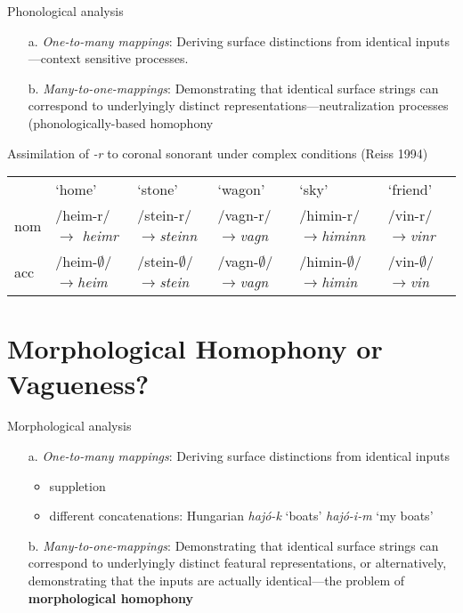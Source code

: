 \documentclass[10pt]{article}
\begin{document}
\begin{example}Phonological analysis
\end{example}

\begin{itemize}
\item[a.]{{\it One-to-many mappings}: Deriving surface distinctions from  identical inputs---context sensitive processes.}
\item[b.]{{\it Many-to-one-mappings}: Demonstrating that identical surface strings can correspond to   underlyingly distinct representations---neutralization processes (phonologically-based homophony}
\end{itemize}






\begin{example}Assimilation of {\it -r} to coronal sonorant under complex conditions (Reiss 1994)
\end{example}

\noindent \begin{tabular}{|l| l |l|l|l|l|} \hline 
&{`home'}&{`stone'}&{`wagon'}&{`sky'}&{`friend'} \\ \cline{2-6} 
{\sc nom}&{/heim-r/ $\rightarrow$ {\it heimr}}&{/stein-r/ $\rightarrow${\it steinn}} &{/vagn-r/ $\rightarrow${\it vagn}}&{/himin-r/ $\rightarrow${\it himinn}}&{/vin-r/ $\rightarrow${\it vinr}}\\ 
{\sc acc}&{/heim-$\emptyset$/ $\rightarrow${\it heim}}&{/stein-$\emptyset$/ $\rightarrow${\it stein}}&{/vagn-$\emptyset$/ $\rightarrow${\it vagn}}&{/himin-$\emptyset$/ $\rightarrow${\it himin}}&{/vin-$\emptyset$/ $\rightarrow${\it vin}} \\ \hline
\end{tabular}






\section{Morphological Homophony or Vagueness?}
\begin{example}Morphological analysis
\end{example}

\begin{itemize}
\item[a.]{{\it One-to-many mappings}: Deriving surface distinctions from  identical inputs}
\begin{itemize}
\item{suppletion}
\item{different concatenations: Hungarian {\it haj\'{o}-k} `boats' {\it haj\'{o}-i-m} `my boats' }
\end{itemize}
\item[b.]{{\it Many-to-one-mappings}: Demonstrating that identical surface strings can correspond to   underlyingly distinct featural representations, or alternatively, demonstrating that the inputs are actually identical---the problem of {\bf morphological homophony}}
\end{itemize}
\end{document}
